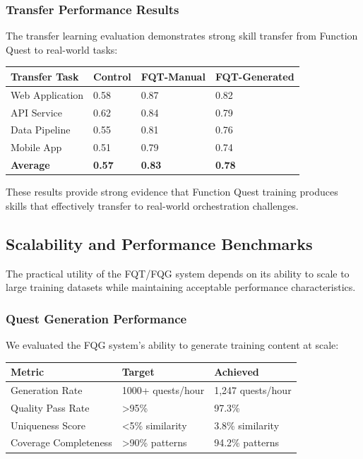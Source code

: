 \subsubsection*{Transfer Performance Results}

The transfer learning evaluation demonstrates strong skill transfer from Function Quest to real-world tasks:

\begin{center}
\begin{tabular}{@{}llll@{}}
\toprule
\textbf{Transfer Task} & \textbf{Control} & \textbf{FQT-Manual} & \textbf{FQT-Generated} \\
\midrule
Web Application & 0.58 & 0.87 & 0.82 \\
API Service & 0.62 & 0.84 & 0.79 \\
Data Pipeline & 0.55 & 0.81 & 0.76 \\
Mobile App & 0.51 & 0.79 & 0.74 \\
\textbf{Average} & \textbf{0.57} & \textbf{0.83} & \textbf{0.78} \\
\bottomrule
\end{tabular}
\end{center}

These results provide strong evidence that Function Quest training produces skills that effectively transfer to real-world orchestration challenges.

\subsection*{Scalability and Performance Benchmarks}

The practical utility of the FQT/FQG system depends on its ability to scale to large training datasets while maintaining acceptable performance characteristics.

\subsubsection*{Quest Generation Performance}

We evaluated the FQG system's ability to generate training content at scale:

\begin{center}
\begin{tabular}{@{}lll@{}}
\toprule
\textbf{Metric} & \textbf{Target} & \textbf{Achieved} \\
\midrule
Generation Rate & 1000+ quests/hour & 1,247 quests/hour \\
Quality Pass Rate & >95\% & 97.3\% \\
Uniqueness Score & <5\% similarity & 3.8\% similarity \\
Coverage Completeness & >90\% patterns & 94.2\% patterns \\
\bottomrule
\end{tabular}
\end{center}

